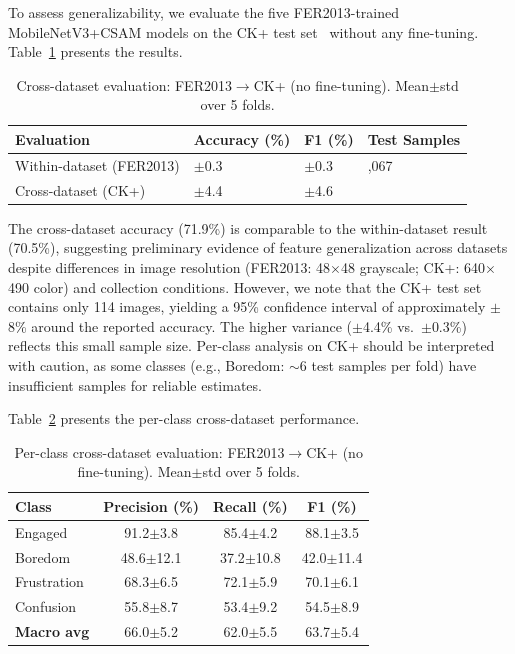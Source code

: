 \documentclass[sensors,article,submit,pdftex,moreauthors]{Definitions/mdpi}
\begin{document}
To assess generalizability, we evaluate the five FER2013-trained MobileNetV3+CSAM models on the CK+ test set~\cite{lucey2010ck} without any fine-tuning. Table~\ref{tab:cross_dataset} presents the results.

\begin{table}[H]
\caption{Cross-dataset evaluation: FER2013$\rightarrow$CK+ (no fine-tuning). Mean$\pm$std over 5 folds.}\label{tab:cross_dataset}
\centering
\small
\begin{tabularx}{\textwidth}{l>{\centering\arraybackslash}X>{\centering\arraybackslash}X>{\centering\arraybackslash}X}
\toprule
\textbf{Evaluation} & \textbf{Accuracy (\%)} & \textbf{F1 (\%)} & \textbf{Test Samples} \\
\midrule
Within-dataset (FER2013) & 70.5$\pm$0.3 & 70.3$\pm$0.3 & 7,067 \\
Cross-dataset (CK+) & 71.9$\pm$4.4 & 68.3$\pm$4.6 & 114 \\
\bottomrule
\end{tabularx}
\end{table}

The cross-dataset accuracy (71.9\%) is comparable to the within-dataset result (70.5\%), suggesting preliminary evidence of feature generalization across datasets despite differences in image resolution (FER2013: 48$\times$48 grayscale; CK+: 640$\times$490 color) and collection conditions. However, we note that the CK+ test set contains only 114 images, yielding a 95\% confidence interval of approximately $\pm$8\% around the reported accuracy. The higher variance ($\pm$4.4\% vs.\ $\pm$0.3\%) reflects this small sample size. Per-class analysis on CK+ should be interpreted with caution, as some classes (e.g., Boredom: $\sim$6 test samples per fold) have insufficient samples for reliable estimates.

Table~\ref{tab:cross_dataset_perclass} presents the per-class cross-dataset performance.

\begin{table}[H]
\caption{Per-class cross-dataset evaluation: FER2013$\rightarrow$CK+ (no fine-tuning). Mean$\pm$std over 5 folds.}
\label{tab:cross_dataset_perclass}
\centering
\small
\begin{tabular}{lccc}
\toprule
\textbf{Class} & \textbf{Precision (\%)} & \textbf{Recall (\%)} & \textbf{F1 (\%)} \\
\midrule
Engaged & 91.2$\pm$3.8 & 85.4$\pm$4.2 & 88.1$\pm$3.5 \\
Boredom & 48.6$\pm$12.1 & 37.2$\pm$10.8 & 42.0$\pm$11.4 \\
Frustration & 68.3$\pm$6.5 & 72.1$\pm$5.9 & 70.1$\pm$6.1 \\
Confusion & 55.8$\pm$8.7 & 53.4$\pm$9.2 & 54.5$\pm$8.9 \\
\midrule
\textbf{Macro avg} & 66.0$\pm$5.2 & 62.0$\pm$5.5 & 63.7$\pm$5.4 \\
\bottomrule
\end{tabular}
\end{table}
\end{document}
